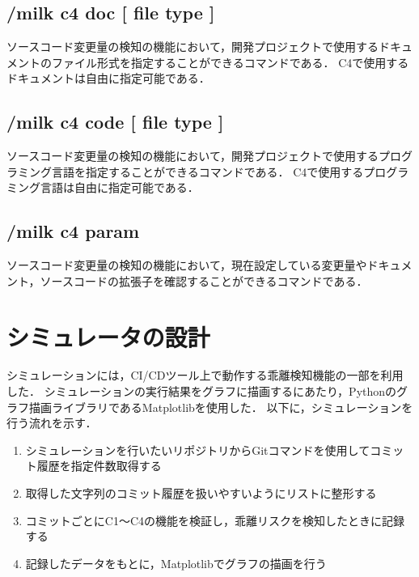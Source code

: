 \subsection*{/milk c4 doc [ file type ]}
ソースコード変更量の検知の機能において，開発プロジェクトで使用するドキュメントのファイル形式を指定することができるコマンドである．
C4で使用するドキュメントは自由に指定可能である．

\subsection*{/milk c4 code [ file type ]}
ソースコード変更量の検知の機能において，開発プロジェクトで使用するプログラミング言語を指定することができるコマンドである．
C4で使用するプログラミング言語は自由に指定可能である．

\subsection*{/milk c4 param}
ソースコード変更量の検知の機能において，現在設定している変更量やドキュメント，ソースコードの拡張子を確認することができるコマンドである．

\section{シミュレータの設計}
シミュレーションには，CI/CDツール上で動作する乖離検知機能の一部を利用した．
シミュレーションの実行結果をグラフに描画するにあたり，Pythonのグラフ描画ライブラリであるMatplotlibを使用した．
以下に，シミュレーションを行う流れを示す．
\begin{enumerate}
    \item シミュレーションを行いたいリポジトリからGitコマンドを使用してコミット履歴を指定件数取得する
    \item 取得した文字列のコミット履歴を扱いやすいようにリストに整形する
    \item コミットごとにC1〜C4の機能を検証し，乖離リスクを検知したときに記録する
    \item 記録したデータをもとに，Matplotlibでグラフの描画を行う
\end{enumerate}